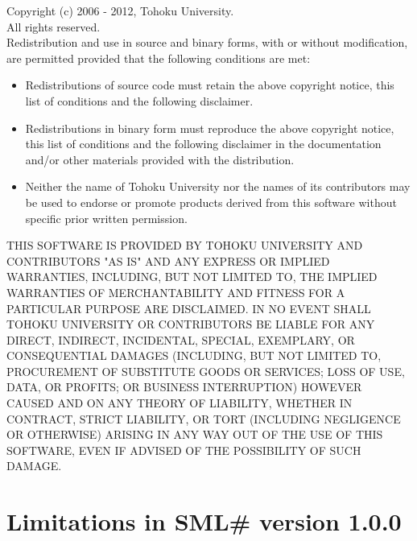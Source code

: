 \documentclass{jbook}
\newcommand{\txt}[2]{#2}
\newcommand{\smlsharp}{SML\#}
\newcommand{\version}{1.0.0}
\begin{document}
Copyright (c) 2006 - 2012, Tohoku University.\\
All rights reserved.\\

Redistribution and use in source and binary forms, with or without
modification, are permitted provided that the following conditions are
met:

\begin{itemize}
\item 
  Redistributions of source code must retain the above copyright
  notice, this list of conditions and the following disclaimer. 
\item 
  Redistributions in binary form must reproduce the above
  copyright notice, this list of conditions and the following disclaimer
  in the documentation and/or other materials provided with the
  distribution. 
\item 
  Neither the name of Tohoku University nor the names of its
  contributors may be used to endorse or promote products derived from
  this software without specific prior written permission.  
\end{itemize}

THIS SOFTWARE IS PROVIDED BY TOHOKU UNIVERSITY AND CONTRIBUTORS "AS IS"
AND ANY EXPRESS OR IMPLIED WARRANTIES, INCLUDING, BUT NOT LIMITED TO,
THE IMPLIED WARRANTIES OF MERCHANTABILITY AND FITNESS FOR A PARTICULAR
PURPOSE ARE DISCLAIMED. IN NO EVENT SHALL TOHOKU UNIVERSITY OR
CONTRIBUTORS BE LIABLE FOR ANY DIRECT, INDIRECT, INCIDENTAL, SPECIAL,
EXEMPLARY, OR CONSEQUENTIAL DAMAGES (INCLUDING, BUT NOT LIMITED TO,
PROCUREMENT OF SUBSTITUTE GOODS OR SERVICES; LOSS OF USE, DATA, OR
PROFITS; OR BUSINESS INTERRUPTION) HOWEVER CAUSED AND ON ANY THEORY OF
LIABILITY, WHETHER IN CONTRACT, STRICT LIABILITY, OR TORT (INCLUDING
NEGLIGENCE OR OTHERWISE) ARISING IN ANY WAY OUT OF THE USE OF THIS
SOFTWARE, EVEN IF ADVISED OF THE POSSIBILITY OF SUCH DAMAGE.

\section{
\txt{\smlsharp{}第\version{}版の機能と制限}
{Limitations in \smlsharp{} version \version{}}
}
\end{document}

